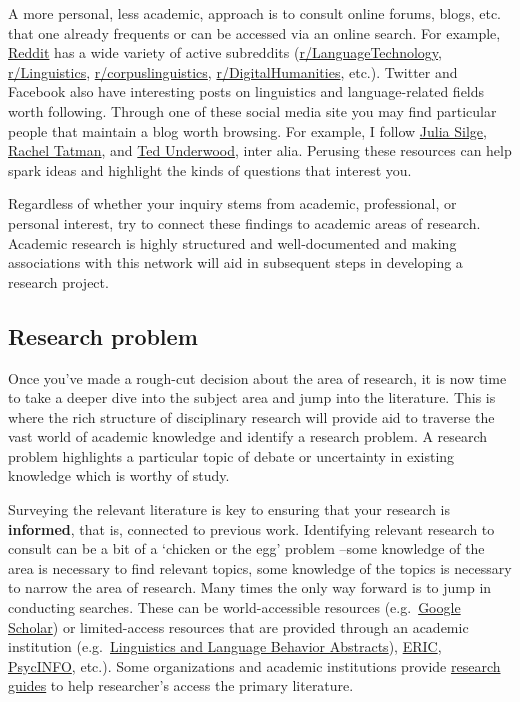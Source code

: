 \documentclass[
  letterpaper,
]{latex/krantz}
\begin{document}
A more personal, less academic, approach is to consult online forums,
blogs, etc. that one already frequents or can be accessed via an online
search. For example, \href{https://www.reddit.com/}{Reddit} has a wide
variety of active subreddits
(\href{https://www.reddit.com/r/LanguageTechnology/}{r/LanguageTechnology},
\href{https://www.reddit.com/r/linguistics/}{r/Linguistics},
\href{https://www.reddit.com/r/corpuslinguistics/}{r/corpuslinguistics},
\href{https://www.reddit.com/r/DigitalHumanities/}{r/DigitalHumanities},
etc.). Twitter and Facebook also have interesting posts on linguistics
and language-related fields worth following. Through one of these social
media site you may find particular people that maintain a blog worth
browsing. For example, I follow \href{https://juliasilge.com/}{Julia
Silge}, \href{http://www.rctatman.com/}{Rachel Tatman}, and
\href{https://tedunderwood.com/}{Ted Underwood}, inter alia. Perusing
these resources can help spark ideas and highlight the kinds of
questions that interest you.

Regardless of whether your inquiry stems from academic, professional, or
personal interest, try to connect these findings to academic areas of
research. Academic research is highly structured and well-documented and
making associations with this network will aid in subsequent steps in
developing a research project.

\hypertarget{research-problem}{%
\subsection{Research problem}\label{research-problem}}

Once you've made a rough-cut decision about the area of research, it is
now time to take a deeper dive into the subject area and jump into the
literature. This is where the rich structure of disciplinary research
will provide aid to traverse the vast world of academic knowledge and
identify a research problem. A research problem highlights a particular
topic of debate or uncertainty in existing knowledge which is worthy of
study.

Surveying the relevant literature is key to ensuring that your research
is \textbf{informed}, that is, connected to previous work. Identifying
relevant research to consult can be a bit of a `chicken or the egg'
problem --some knowledge of the area is necessary to find relevant
topics, some knowledge of the topics is necessary to narrow the area of
research. Many times the only way forward is to jump in conducting
searches. These can be world-accessible resources
(e.g.~\href{https://scholar.google.com/}{Google Scholar}) or
limited-access resources that are provided through an academic
institution
(e.g.~\href{https://about.proquest.com/en/products-services/llba-set-c}{Linguistics
and Language Behavior Abstracts}), \href{https://eric.ed.gov/}{ERIC},
\href{https://www.ebsco.com/products/research-databases/apa-psycinfo}{PsycINFO},
etc.). Some organizations and academic institutions provide
\href{https://guides.zsr.wfu.edu/linguistics}{research guides} to help
researcher's access the primary literature.
\end{document}
